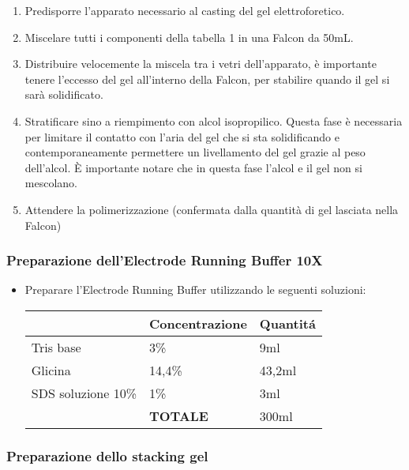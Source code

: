 \begin{enumerate}
	\item Predisporre l'apparato necessario al casting del gel elettroforetico.

	\item Miscelare tutti i componenti della tabella 1 in una Falcon da 50mL.

	\item Distribuire velocemente la miscela tra i vetri dell'apparato, \`e importante
	tenere l'eccesso del gel all'interno della Falcon, per stabilire quando il gel
	si sar\`a solidificato.

	\item Stratificare sino a riempimento con alcol isopropilico.
	Questa fase \`e necessaria per limitare il contatto con l'aria
	del gel che si sta solidificando e contemporaneamente	permettere
	un livellamento del gel grazie al peso dell'alcol.
	\`E importante notare che in questa fase l'alcol e
	il gel non si mescolano.

	\item Attendere la polimerizzazione (confermata dalla quantit\`a di
	gel lasciata nella Falcon)
\end{enumerate}

\subsubsection{Preparazione dell'Electrode Running Buffer 10X}
\begin{itemize}
	\item Preparare l'Electrode Running Buffer utilizzando
	le seguenti soluzioni:\\
	\begin{tabular}{|l|l|l|} \hline
		& \textbf{Concentrazione} & \textbf{Quantit\'a} \\\hline
		Tris base & 3\% & 9ml \\\hline
		Glicina & 14,4\% & 43,2ml \\\hline
		SDS soluzione 10\% & 1\% & 3ml \\\hline
		& \textbf{TOTALE} & 300ml \\\hline
	\end{tabular}
\end{itemize}

\subsubsection{Preparazione dello stacking gel}

